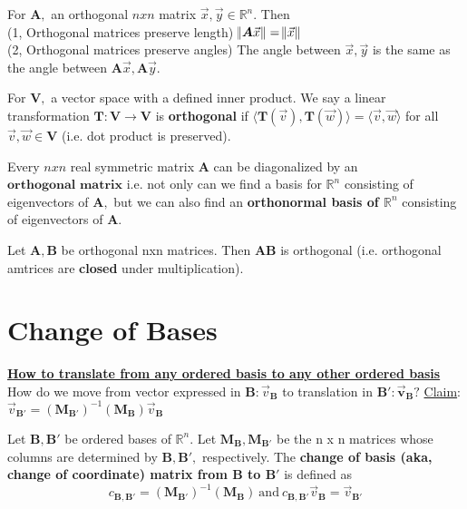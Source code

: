 \documentclass{article}
\begin{document}
\begin{corollary}
For $\boldsymbol{A},$ an orthogonal $n x n$ matrix $\vec{x}, \vec{y} \in \mathbb{R}^{n}.$ Then \\
(1, Orthogonal matrices preserve length) $\norm{\boldsymbol{A}\vec{x}} = \norm{\vec{x}}$ \\
(2, Orthogonal matrices preserve angles) The angle between $\vec{x}, \vec{y}$ is the same as the angle between $\boldsymbol{A}\vec{x}, \boldsymbol{A}\vec{y}.$
\end{corollary}

\begin{definition}
For $\boldsymbol{V},$ a vector space with a defined inner product. We say a linear transformation $\boldsymbol{T} : \boldsymbol{V} \rightarrow \boldsymbol{V}$ is \textbf{orthogonal} if $\langle \boldsymbol{T}(\vec{v}), \boldsymbol{T}(\vec{w}) \rangle = \langle \vec{v}, \vec{w} \rangle$ for all $\vec{v}, \vec{w} \in \boldsymbol{V}$ (i.e. dot product is preserved).
\end{definition}

\begin{theorem}
Every $nxn$ real symmetric matrix $\boldsymbol{A}$ can be diagonalized by an $\textbf{orthogonal matrix}$ i.e. not only can we find a basis for $\mathbb{R}^n$ consisting of eigenvectors of $\boldsymbol{A},$ but we can also find an \textbf{orthonormal basis of $\mathbb{R}^n$} consisting of eigenvectors of $\boldsymbol{A}.$
\end{theorem}

\begin{theorem}
Let $\boldsymbol{A}, \boldsymbol{B}$ be orthogonal nxn matrices. Then $\boldsymbol{AB}$ is orthogonal (i.e. orthogonal amtrices are \textbf{closed} under multiplication). \\

\end{theorem}

\newpage
\section{Change of Bases}
\textbf{\underline{How to translate from any ordered basis to any other ordered basis}} \\
How do we move from vector expressed in $\boldsymbol{B}: \vec{v}_{\boldsymbol{B}}$ to translation in $\boldsymbol{B': \vec{v}_{\boldsymbol{B}}}?$
\underline{Claim}: $\vec{v}_{\boldsymbol{B'}} = (\boldsymbol{M}_{\boldsymbol{B'}})^{-1}(\boldsymbol{M}_{\boldsymbol{B}})\vec{v}_{\boldsymbol{B}}$

\begin{definition}
Let $\boldsymbol{B, B'}$ be ordered bases of $\mathbb{R}^n.$ Let $\boldsymbol{M}_{\boldsymbol{B}}, \boldsymbol{M}_{\boldsymbol{B'}}$ be the n x n matrices whose columns are determined by $\boldsymbol{B}, \boldsymbol{B'},$ respectively. The \textbf{change of basis (aka, change of coordinate) matrix from $\boldsymbol{B}$ to $\boldsymbol{B'}$} is defined as 
\[
c_{\boldsymbol{B}, \boldsymbol{B'}} = (\boldsymbol{M}_{\boldsymbol{B'}})^{-1}(\boldsymbol{M}_{\boldsymbol{B}}) \ \text{and} \
c_{\boldsymbol{B}, \boldsymbol{B'}}\vec{v}_{\boldsymbol{B}} = \vec{v}_{\boldsymbol{B'}}
\]
\end{definition}
\end{document}
